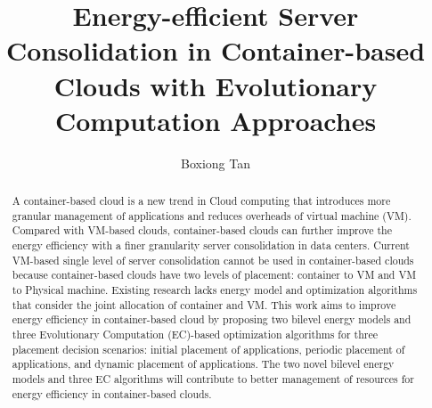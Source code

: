 \documentclass[11pt
              , a4paper
              , twoside
              , openright
              ]{report}
\title{Energy-efficient Server Consolidation in Container-based Clouds with Evolutionary Computation Approaches}
\author{Boxiong Tan}
\date{}
\begin{document}



\begin{abstract}
\small
A container-based cloud is a new trend in Cloud computing that introduces more granular management of applications and reduces overheads of virtual machine (VM).  Compared with VM-based clouds, container-based clouds can further improve the energy efficiency with a finer granularity server consolidation in data centers. Current VM-based single level of server consolidation cannot be used in container-based clouds because container-based clouds have two levels of placement: container to VM and VM to Physical machine. Existing research lacks energy model and optimization algorithms that consider the joint allocation of container and VM. 
This work aims to improve energy efficiency in container-based cloud by proposing two bilevel energy models and three Evolutionary Computation (EC)-based optimization algorithms for three placement decision scenarios: initial placement of applications, periodic placement of applications, and dynamic placement of applications. The two novel bilevel energy models and three EC algorithms will contribute to better management of resources for energy efficiency in container-based clouds. 


\end{abstract}


\maketitle

% 

\tableofcontents



\mainmatter









\backmatter



%


\end{document}

